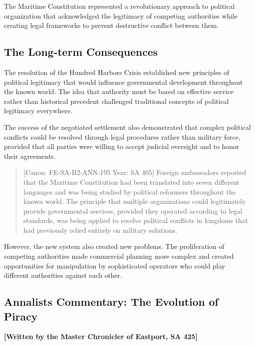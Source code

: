 The Maritime Constitution represented a revolutionary approach to
political organization that acknowledged the legitimacy of competing
authorities while creating legal frameworks to prevent destructive
conflict between them.

\subsection{The Long-term
Consequences}\label{the-long-term-consequences}

The resolution of the Hundred Harbors Crisis established new principles
of political legitimacy that would influence governmental development
throughout the known world. The idea that authority must be based on
effective service rather than historical precedent challenged
traditional concepts of political legitimacy everywhere.

The success of the negotiated settlement also demonstrated that complex
political conflicts could be resolved through legal procedures rather
than military force, provided that all parties were willing to accept
judicial oversight and to honor their agreements.

\begin{quote}
{[}Canon: FE-SA-B2-ANN-195 \textbar{} Year: SA 405{]} Foreign
ambassadors reported that the Maritime Constitution had been translated
into seven different languages and was being studied by political
reformers throughout the known world. The principle that multiple
organizations could legitimately provide governmental services, provided
they operated according to legal standards, was being applied to resolve
political conflicts in kingdoms that had previously relied entirely on
military solutions.
\end{quote}

However, the new system also created new problems. The proliferation of
competing authorities made commercial planning more complex and created
opportunities for manipulation by sophisticated operators who could play
different authorities against each other.

\subsection{Annalist\textquotesingle s Commentary: The Evolution of
Piracy}\label{annalists-commentary-the-evolution-of-piracy}

\textbf{{[}Written by the Master Chronicler of Eastport, SA 425{]}}

